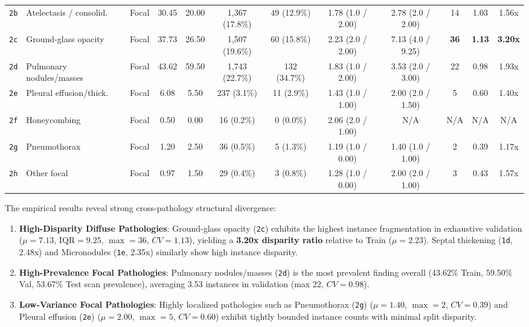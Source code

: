 \documentclass[11pt,a4paper]{article}
\begin{document}
\begin{table}[htbp]
\begin{tabularx}{\linewidth}{clcccccc cc cc}
\texttt{2b} & Atelectasis / consolid.  & Focal & 30.45 & 20.00 & 1,367 (17.8\%) & 49 (12.9\%) & 1.78 (1.0 / 2.00) & 2.78 (2.0 / 2.00) & 14 & 1.03 & 1.56x \\
\texttt{2c} & Ground-glass opacity     & Focal & 37.73 & 26.50 & 1,507 (19.6\%) & 60 (15.8\%) & 2.23 (2.0 / 2.00) & 7.13 (4.0 / 9.25) & \textbf{36} & \textbf{1.13} & \textbf{3.20x} \\
\texttt{2d} & Pulmonary nodules/masses & Focal & 43.62 & 59.50 & 1,743 (22.7\%) & 132 (34.7\%) & 1.83 (1.0 / 2.00) & 3.53 (2.0 / 3.00) & 22 & 0.98 & 1.93x \\
\texttt{2e} & Pleural effusion/thick.  & Focal & 6.08 & 5.50 & 237 (3.1\%) & 11 (2.9\%) & 1.43 (1.0 / 1.00) & 2.00 (2.0 / 1.50) & 5 & 0.60 & 1.40x \\
\texttt{2f} & Honeycombing             & Focal & 0.50 & 0.00 & 16 (0.2\%) & 0 (0.0\%) & 2.06 (2.0 / 1.00) & N/A & N/A & N/A & N/A \\
\texttt{2g} & Pneumothorax             & Focal & 1.20 & 2.50 & 36 (0.5\%) & 5 (1.3\%) & 1.19 (1.0 / 0.00) & 1.40 (1.0 / 1.00) & 2 & 0.39 & 1.17x \\
\texttt{2h} & Other focal              & Focal & 0.97 & 1.50 & 29 (0.4\%) & 3 (0.8\%) & 1.28 (1.0 / 0.00) & 2.00 (2.0 / 1.00) & 3 & 0.43 & 1.57x \\
\bottomrule
\end{tabularx}
\end{table}

The empirical results reveal strong cross-pathology structural divergence:
\begin{enumerate}
    \item \textbf{High-Disparity Diffuse Pathologies}: Ground-glass opacity (\texttt{2c}) exhibits the highest instance fragmentation in exhaustive validation ($\mu = 7.13$, $\text{IQR} = 9.25$, $\max = 36$, $CV = 1.13$), yielding a \textbf{3.20x disparity ratio} relative to Train ($\mu = 2.23$). Septal thickening (\texttt{1d}, 2.48x) and Micronodules (\texttt{1e}, 2.35x) similarly show high instance disparity.
    \item \textbf{High-Prevalence Focal Pathologies}: Pulmonary nodules/masses (\texttt{2d}) is the most prevalent finding overall (43.62\% Train, 59.50\% Val, 53.67\% Test scan prevalence), averaging 3.53 instances in validation (max 22, $CV = 0.98$).
    \item \textbf{Low-Variance Focal Pathologies}: Highly localized pathologies such as Pneumothorax (\texttt{2g}) ($\mu = 1.40$, $\max = 2$, $CV = 0.39$) and Pleural effusion (\texttt{2e}) ($\mu = 2.00$, $\max = 5$, $CV = 0.60$) exhibit tightly bounded instance counts with minimal split disparity.
\end{enumerate}
\end{document}
